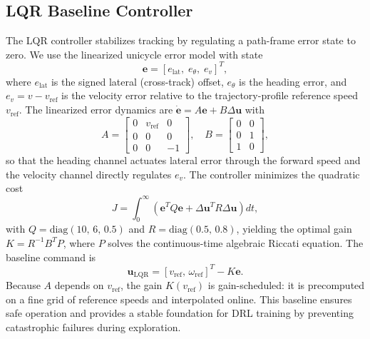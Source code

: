 \documentclass[conference]{IEEEtran}
\begin{document}
\subsection{LQR Baseline Controller}
The LQR controller stabilizes tracking by regulating a path-frame error state to zero. We use the linearized unicycle error model with state
\begin{equation}
\mathbf{e} = [e_{\text{lat}},\; e_{\theta},\; e_{v}]^T,
\end{equation}
where $e_{\text{lat}}$ is the signed lateral (cross-track) offset, $e_{\theta}$ is the heading error, and $e_{v} = v - v_{\text{ref}}$ is the velocity error relative to the trajectory-profile reference speed $v_{\text{ref}}$. The linearized error dynamics are $\dot{\mathbf{e}} = A\mathbf{e} + B\Delta\mathbf{u}$ with
\begin{equation}
A = \begin{bmatrix} 0 & v_{\text{ref}} & 0 \\ 0 & 0 & 0 \\ 0 & 0 & -1 \end{bmatrix},\quad
B = \begin{bmatrix} 0 & 0 \\ 0 & 1 \\ 1 & 0 \end{bmatrix},
\end{equation}
so that the heading channel actuates lateral error through the forward speed and the velocity channel directly regulates $e_v$. The controller minimizes the quadratic cost
\begin{equation}
J = \int_0^\infty \left(\mathbf{e}^T Q \mathbf{e} + \Delta\mathbf{u}^T R \Delta\mathbf{u}\right) dt,
\end{equation}
with $Q = \mathrm{diag}(10,\,6,\,0.5)$ and $R = \mathrm{diag}(0.5,\,0.8)$, yielding the optimal gain $K = R^{-1}B^T P$, where $P$ solves the continuous-time algebraic Riccati equation. The baseline command is
\begin{equation}
\mathbf{u}_{\text{LQR}} = [v_{\text{ref}},\, \omega_{\text{ref}}]^T - K\mathbf{e}.
\end{equation}
Because $A$ depends on $v_{\text{ref}}$, the gain $K(v_{\text{ref}})$ is gain-scheduled: it is precomputed on a fine grid of reference speeds and interpolated online. This baseline ensures safe operation and provides a stable foundation for DRL training by preventing catastrophic failures during exploration.
\end{document}
